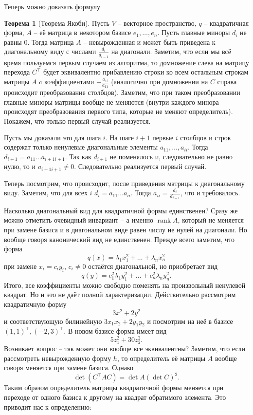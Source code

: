 \documentclass[10pt,a4paper,oneside]{book} %
\theoremstyle{definition}
\newtheorem{thm}{Теорема}
\newcommand{\rank}{\operatorname{rank}}
\def\thrm{\begin{thm}}
\def\ethrm{\end{thm}}
\begin{document}
Теперь можно доказать формулу 
\thrm[Теорема Якоби]
Пусть $V$ -- векторное пространство, $q$ -- квадратичная форма, $A$ -- её матрица в некотором базисе $e_1,\dots,e_n$. Пусть главные миноры $d_i$ не равны 0. 
Тогда матрица $A$ -- невырожденная и может быть приведена к диагональному виду с числами $\frac{d_{i}}{d_{i-1}}$ на диагонали.
\proof Заметим, что если мы всё время пользуемся первым случаем из алгоритма, то домножение слева на матрицу перехода $C^{\top}$ будет эквивалентно прибавлению строки ко всем остальным строкам матрицы $A$ c коэффициентами $-\frac{a_{1i}}{a_{11}}$ (аналогично при домножении на $C$ справа происходит преобразование столбцов). Заметим, что при таком преобразовании главные миноры матрицы вообще не меняются (внутри каждого минора происходят преобразования первого типа, которые не меняют определитель). Покажем, что только первый случай реализуется. 

Пусть мы доказали это для шага $i$. На шаге $i+1$ первые $i$ столбцов и строк содержат только ненулевые диагональные элементы $a_{11},\dots, a_{ii}$. Тогда $d_{i+1}=a_{11}\dots a_{i+1 i+1}$. Так как $d_{i+1}$ не  поменялось и, следовательно не равно нулю, то и $a_{i+1 i+1} \neq 0$. Следовательно реализуется первый случай. 

Теперь посмотрим, что происходит, после приведения матрицы к диагональному виду. Заметим, что для всех $i$ $d_i=a_{11}\dots a_{ii}$. Тогда $a_{ii}=\frac{d_i}{d_{i-1}}$, что и требовалось.
\endproof
\ethrm




Насколько диагональный вид для квадратичной формы единственен? Сразу же можно отметить очевидный инвариант -- а именно $\rank A$, который не меняется при замене базиса и в диагональном виде равен числу не нулей на диагонали. Но вообще говоря канонический вид не единственен. Прежде всего заметим, что форма 
$$q(x)=\lambda_1 x_1^2+\dots+\lambda_nx_n^2$$
при замене $x_i=c_i y_i$, $c_i\neq 0$ остаётся диагональной, но приобретает вид 
$$q(y)=c_1^2\lambda_1y_1^2+\dots+c_n^2\lambda_ny_n^2.$$
Итого, все коэффициенты можно свободно поменять на произвольный ненулевой квадрат. Но и это не даёт полной характеризации. Действительно  рассмотрим квадратичную форму
$$3x^2+2y^2$$
и соответствующую билинейную $3x_1x_2+2y_1y_2$ и посмотрим на неё в базисе $(1,1)^{\top}, (-2,3)^{\top}$. В новом базисе форма имеет вид
$$5z_1^2+30z_2^2.$$
Возникает вопрос -- так может они вообще все эквивалентны? Заметим, что если рассмотреть невырожденную форму $h$, то определитель её матрицы $A$ вообще говоря меняется при замене базиса. Однако 
$$\det(C^{\top}AC)=\det A (\det C)^2.$$
Таким образом определитель матрицы квадратичной формы меняется при переходе от одного базиса к другому на квадрат обратимого элемента. Это приводит нас к определению:
\end{document}
